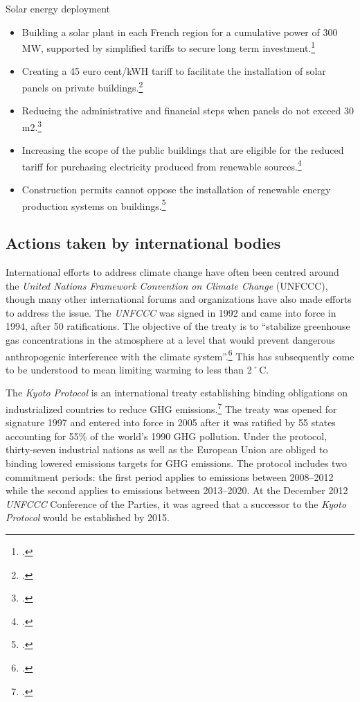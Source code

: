 Solar energy deployment
\begin{itemize}
	\item Building a solar plant in each French region for a cumulative power of 300 MW, supported by simplified tariffs to secure long term investment.\footcite[][]{GrenellePolicies}
	\item Creating a 45 euro cent/kWH tariff to facilitate the installation of solar panels on private buildings.\footcite[][]{GrenellePolicies}
	\item Reducing the administrative and financial steps when panels do not exceed 30 m2.\footcite[][]{GrenellePolicies}
	\item Increasing the scope of the public buildings that are eligible for the reduced tariff for purchasing electricity produced from renewable sources.\footcite[][]{GrenellePolicies}
	\item Construction permits cannot oppose the installation of renewable energy production systems on buildings.\footcite[][]{GrenellePolicies}
\end{itemize}






		\subsection{Actions taken by international bodies}
		
		
		



International efforts to address climate change have often been centred around the \emph{United Nations Framework Convention on Climate Change} (UNFCCC), though many other international forums and organizations have also made efforts to address the issue. 
The \emph{UNFCCC} was signed in 1992 and came into force in 1994, after 50 ratifications.
The objective of the treaty is to ``stabilize greenhouse gas concentrations in the atmosphere at a level that would prevent dangerous anthropogenic interference with the climate system''.\footcite[][Artice 2: "Objective"]{UNFCCC}
This has subsequently come to be understood to mean limiting warming to less than 2˚C.



The \emph{Kyoto Protocol} is an international treaty establishing binding obligations on industrialized countries to reduce GHG emissions.\footcite[][]{KyotoProtocol}
The treaty was opened for signature 1997 and entered into force in 2005 after it was ratified by 55 states accounting for 55\% of the world's 1990 GHG pollution.
Under the protocol, thirty-seven industrial nations as well as the European Union are obliged to binding lowered emissions targets for GHG emissions.
The protocol includes two commitment periods: the first period applies to emissions between 2008--2012 while the second  applies to emissions between 2013--2020. 
At the December 2012 \emph{UNFCCC} Conference of the Parties, it was agreed that a successor to the \emph{Kyoto Protocol} would be established by 2015.

